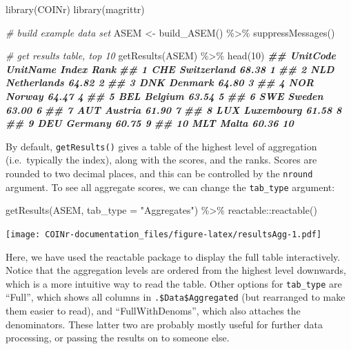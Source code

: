 \documentclass[
]{book}
\newenvironment{Shaded}{\begin{snugshade}}{\end{snugshade}}
\newcommand{\AttributeTok}[1]{\textcolor[rgb]{0.77,0.63,0.00}{#1}}
\newcommand{\CommentTok}[1]{\textcolor[rgb]{0.56,0.35,0.01}{\textit{#1}}}
\newcommand{\DecValTok}[1]{\textcolor[rgb]{0.00,0.00,0.81}{#1}}
\newcommand{\DocumentationTok}[1]{\textcolor[rgb]{0.56,0.35,0.01}{\textbf{\textit{#1}}}}
\newcommand{\FunctionTok}[1]{\textcolor[rgb]{0.00,0.00,0.00}{#1}}
\newcommand{\NormalTok}[1]{#1}
\newcommand{\OtherTok}[1]{\textcolor[rgb]{0.56,0.35,0.01}{#1}}
\newcommand{\SpecialCharTok}[1]{\textcolor[rgb]{0.00,0.00,0.00}{#1}}
\newcommand{\StringTok}[1]{\textcolor[rgb]{0.31,0.60,0.02}{#1}}
\begin{document}
\begin{Shaded}
\begin{Highlighting}[]
\FunctionTok{library}\NormalTok{(COINr)}
\FunctionTok{library}\NormalTok{(magrittr)}

\CommentTok{\# build example data set}
\NormalTok{ASEM }\OtherTok{\textless{}{-}} \FunctionTok{build\_ASEM}\NormalTok{() }\SpecialCharTok{\%\textgreater{}\%} \FunctionTok{suppressMessages}\NormalTok{()}

\CommentTok{\# get results table, top 10}
\FunctionTok{getResults}\NormalTok{(ASEM) }\SpecialCharTok{\%\textgreater{}\%} \FunctionTok{head}\NormalTok{(}\DecValTok{10}\NormalTok{)}
\DocumentationTok{\#\#    UnitCode    UnitName Index Rank}
\DocumentationTok{\#\# 1       CHE Switzerland 68.38    1}
\DocumentationTok{\#\# 2       NLD Netherlands 64.82    2}
\DocumentationTok{\#\# 3       DNK     Denmark 64.80    3}
\DocumentationTok{\#\# 4       NOR      Norway 64.47    4}
\DocumentationTok{\#\# 5       BEL     Belgium 63.54    5}
\DocumentationTok{\#\# 6       SWE      Sweden 63.00    6}
\DocumentationTok{\#\# 7       AUT     Austria 61.90    7}
\DocumentationTok{\#\# 8       LUX  Luxembourg 61.58    8}
\DocumentationTok{\#\# 9       DEU     Germany 60.75    9}
\DocumentationTok{\#\# 10      MLT       Malta 60.36   10}
\end{Highlighting}
\end{Shaded}

By default, \texttt{getResults()} gives a table of the highest level of aggregation (i.e.~typically the index), along with the scores, and the ranks. Scores are rounded to two decimal places, and this can be controlled by the \texttt{nround} argument. To see all aggregate scores, we can change the \texttt{tab\_type} argument:

\begin{Shaded}
\begin{Highlighting}[]
\FunctionTok{getResults}\NormalTok{(ASEM, }\AttributeTok{tab\_type =} \StringTok{"Aggregates"}\NormalTok{) }\SpecialCharTok{\%\textgreater{}\%}
\NormalTok{  reactable}\SpecialCharTok{::}\FunctionTok{reactable}\NormalTok{()}
\end{Highlighting}
\end{Shaded}

\texttt{[image: COINr-documentation\_files/figure-latex/resultsAgg-1.pdf]}

Here, we have used the reactable package to display the full table interactively. Notice that the aggregation levels are ordered from the highest level downwards, which is a more intuitive way to read the table. Other options for \texttt{tab\_type} are ``Full'', which shows all columns in \texttt{.\$Data\$Aggregated} (but rearranged to make them easier to read), and ``FullWithDenoms'', which also attaches the denominators. These latter two are probably mostly useful for further data processing, or passing the results on to someone else.
\end{document}

